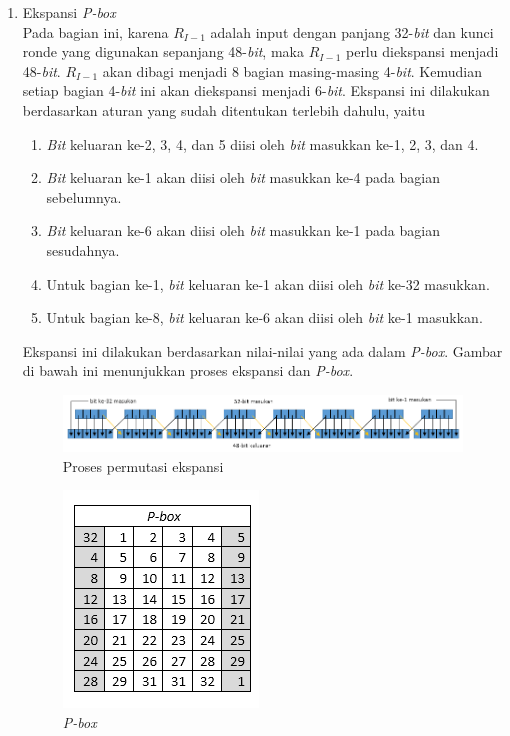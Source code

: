 \begin{enumerate}
	\item Ekspansi \textit{P-box}\\
	Pada bagian ini, karena \begin{math}R_{I-1}\end{math} adalah input dengan panjang 32-\textit{bit} dan kunci ronde yang digunakan sepanjang 48-\textit{bit}, maka \begin{math}R_{I-1}\end{math} perlu diekspansi menjadi 48-\textit{bit}. \begin{math}R_{I-1}\end{math} akan dibagi menjadi 8 bagian masing-masing 4-\textit{bit}. Kemudian setiap bagian 4-\textit{bit} ini akan diekspansi menjadi 6-\textit{bit}. Ekspansi ini dilakukan berdasarkan aturan yang sudah ditentukan terlebih dahulu, yaitu
	\begin{enumerate}
		\item \textit{Bit} keluaran ke-2, 3, 4, dan 5 diisi oleh \textit{bit} masukkan ke-1, 2, 3, dan 4.
		\item \textit{Bit} keluaran ke-1 akan diisi oleh \textit{bit} masukkan ke-4 pada bagian sebelumnya.
		\item \textit{Bit} keluaran ke-6 akan diisi oleh \textit{bit} masukkan ke-1 pada bagian sesudahnya.
		\item Untuk bagian ke-1, \textit{bit} keluaran ke-1 akan diisi oleh \textit{bit} ke-32 masukkan.
		\item Untuk bagian ke-8, \textit{bit} keluaran ke-6 akan diisi oleh \textit{bit} ke-1 masukkan.
	\end{enumerate}
	Ekspansi ini dilakukan berdasarkan nilai-nilai yang ada dalam \textit{P-box}. Gambar di bawah ini menunjukkan proses ekspansi dan \textit{P-box}.
	
	\begin{figure}[h]
	\includegraphics[scale=0.7]{Gambar/expansion_permutation}
	\centering
	\caption{Proses permutasi ekspansi}
	\end{figure}
	
\begin{figure}[h]
	\includegraphics[scale=0.8]{Gambar/P-box}
	\centering
	\caption{\textit{P-box}}
\end{figure}


\end{enumerate}
